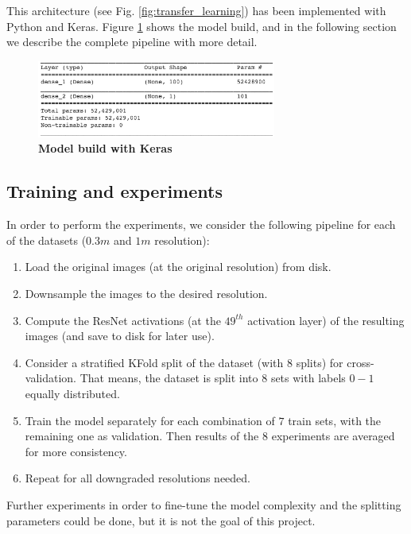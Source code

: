 This architecture (see Fig. \ref{fig:transfer_learning}) has been implemented with Python and Keras. Figure \ref{fig:model_keras} shows the model build, and in the following section we describe the complete pipeline with more detail.

\begin{figure}[h!]
	\centering
	\includegraphics[width=0.7\textwidth]{Figures/model_keras.png}
	\captionsetup{width=1\linewidth}
	\caption{\textbf{Model build with Keras}}
	\label{fig:model_keras}
\end{figure}

\subsection{Training and experiments}

In order to perform the experiments, we consider the following pipeline for each of the datasets ($0.3m$ and $1m$ resolution):

\begin{enumerate}
	\item Load the original images (at the original resolution) from disk.
	\item Downsample the images to the desired resolution.
	\item Compute the ResNet activations (at the $49^{th}$ activation layer) of the resulting images (and save to disk for later use).
	\item Consider a stratified KFold split of the dataset (with $8$ splits) for cross-validation. That means, the dataset is split into $8$ sets with labels $0-1$ equally distributed.  
	\item Train the model separately for each combination of $7$ train sets, with the remaining one as validation. Then results of the $8$ experiments are averaged for more consistency.
	\item Repeat for all downgraded resolutions needed.
\end{enumerate}

Further experiments in order to fine-tune the model complexity and the splitting parameters could be done, but it is not the goal of this project.

